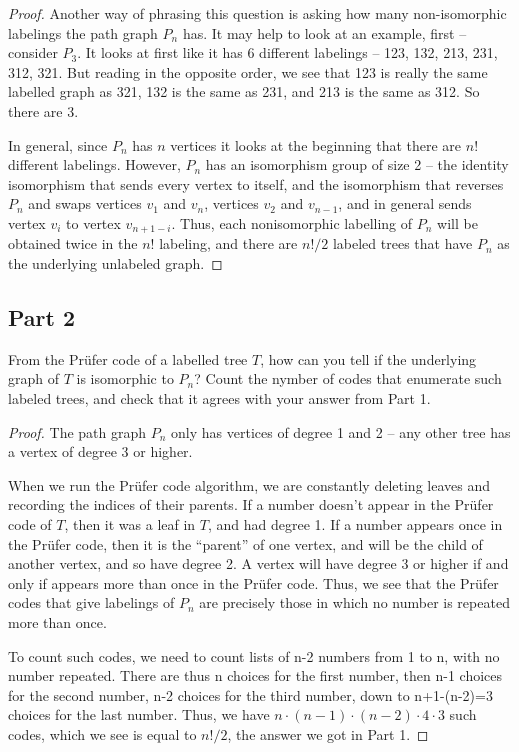 \documentclass{amsart}
\begin{document}
\begin{proof}
Another way of phrasing this question is asking how many non-isomorphic labelings the path graph $P_n$ has.  It may help to look at an example, first -- consider $P_3$.  It looks at first like it has 6 different labelings -- 123, 132, 213, 231, 312, 321.  But reading in the opposite order, we see that 123 is really the same labelled graph as 321, 132 is the same as 231, and 213 is the same as 312.  So there are 3.

In general, since $P_n$ has $n$ vertices it looks at the beginning that there are $n!$ different labelings.  However, $P_n$ has an isomorphism group of size 2 -- the identity isomorphism that sends every vertex to itself, and the isomorphism that reverses $P_n$ and swaps vertices $v_1$ and $v_n$, vertices $v_2$ and $v_{n-1}$, and in general sends vertex $v_i$ to vertex $v_{n+1-i}$.  Thus, each nonisomorphic labelling of $P_n$ will be obtained twice in the $n!$ labeling, and there are $n!/2$ labeled trees that have $P_n$ as the underlying unlabeled graph.


\end{proof}

\subsection{Part 2}
From the Pr\"ufer code of a labelled tree $T$, how can you tell if the underlying graph of $T$ is isomorphic to $P_n$?  Count the nymber of codes that enumerate such labeled trees, and check that it agrees with your answer from Part 1.

\begin{proof}
The path graph $P_n$ only has vertices of degree 1 and 2 -- any other tree has a vertex of degree 3 or higher.

When we run the Pr\"ufer code algorithm, we are constantly deleting leaves and recording the indices of their parents.  If a number doesn't appear in the Pr\"ufer code of $T$, then it was a leaf in $T$, and had degree 1.  If a number appears once in the Pr\"ufer code, then it is the ``parent'' of one vertex, and will be the child of another vertex, and so have degree 2.  A vertex will have degree 3 or higher if and only if appears more than once in the Pr\"ufer code.  Thus, we see that the Pr\"ufer codes that give labelings of $P_n$ are precisely those in which no number is repeated more than once.

To count such codes, we need to count lists of n-2 numbers from 1 to n, with no number repeated.  There are thus n choices for the first number, then n-1 choices for the second number, n-2 choices for the third number, down to n+1-(n-2)=3 choices for the last number.  Thus, we have $n\cdot(n-1)\cdot (n-2)\cdot 4\cdot 3$ such codes, which we see is equal to $n!/2$, the answer we got in Part 1.


\end{proof}
\end{document}
